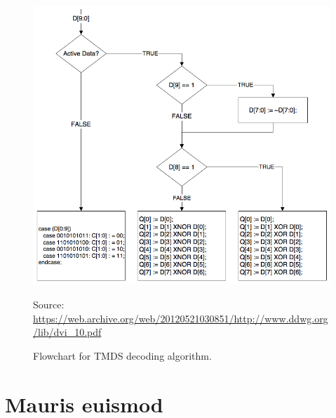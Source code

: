 \begin{appendices}
\begin{figure}
  \centering
  \includegraphics[width=1\textwidth]{./img/tmds_decode.png}\par
Source: \url{https://web.archive.org/web/20120521030851/http://www.ddwg.org/lib/dvi_10.pdf}
  \caption{Flowchart for TMDS decoding algorithm.}
  \label{fig:tmds_decoding_algorithm}
\end{figure}

\chapter{Mauris euismod}
\end{appendices}